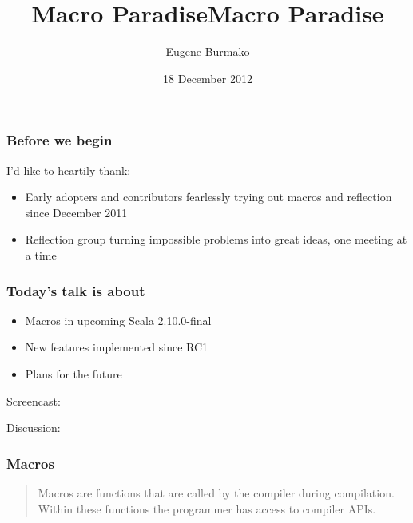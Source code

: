 \documentclass[svgnames,hyperref={bookmarks=false}]{beamer}
\title{Macro Paradise}
\begin{document}
\title{Macro Paradise}
\author{Eugene Burmako}
\date{18 December 2012}
{
\begin{frame}
  \titlepage
\end{frame}
}

\begin{frame}[fragile]
\frametitle{Before we begin}

I'd like to heartily thank:
\begin{itemize}
\item Early adopters and contributors fearlessly trying out macros and reflection since December 2011
\item Reflection group turning impossible problems into great ideas, one meeting at a time
\end{itemize}
\end{frame}

\begin{frame}[fragile]
\frametitle{Today's talk is about}

\begin{itemize}
\item Macros in upcoming Scala 2.10.0-final
\item New features implemented since RC1
\item Plans for the future
\end{itemize}

\vskip40pt

Screencast: 

Discussion: 
\end{frame}

\begin{frame}[fragile]
\frametitle{}

\vskip40pt
\begin{center}
\end{center}
\end{frame}

\begin{frame}[fragile]
\frametitle{Macros}

\begin{quote}
 Macros are functions that are called by the compiler during compilation. Within these functions the programmer has access to compiler APIs. \end{quote}

\begin{flushright}
\textemdash {}
\end{flushright}
\end{frame}
\end{document}
